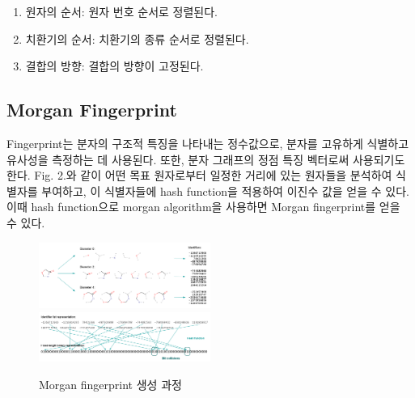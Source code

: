 \documentclass[9pt]{ieeeconf}
\begin{document}
\begin{enumerate}
    \item 원자의 순서: 원자 번호 순서로 정렬된다.
    \item 치환기의 순서: 치환기의 종류 순서로 정렬된다.
    \item 결합의 방향: 결합의 방향이 고정된다.
\end{enumerate}

\subsection[short]{\large {Morgan Fingerprint}}
Fingerprint는 분자의 구조적 특징을 나타내는 정수값으로, 분자를 고유하게 식별하고 유사성을 측정하는 데 사용된다. 
또한, 분자 그래프의 정점 특징 벡터로써 사용되기도 한다. 
Fig. 2.와 같이 어떤 목표 원자로부터 일정한 거리에 있는 원자들을 분석하여 식별자를 부여하고,
이 식별자들에 hash function을 적용하여 이진수 값을 얻을 수 있다. 
이때 hash function으로 morgan algorithm을 사용하면 Morgan fingerprint를 얻을 수 있다. 
\begin{figure}[h]
    \centering
    \includegraphics[width=0.5\textwidth]{./images/mf.png}
    \includegraphics[width=0.5\textwidth]{./images/mf_hash.png}
    \caption{Morgan fingerprint 생성 과정}
\end{figure}

 


\end{document}
